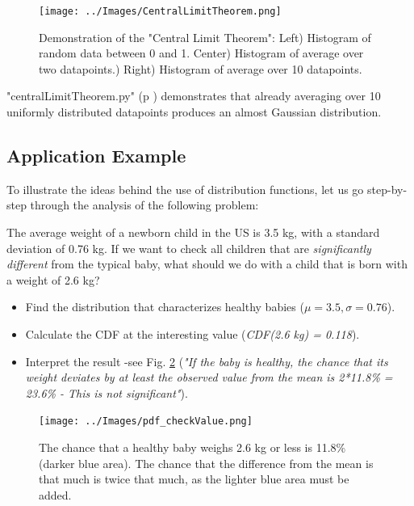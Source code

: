 \begin{figure}
  \centering
  \texttt{[image: ../Images/CentralLimitTheorem.png]}\\
  \caption{Demonstration of the "Central Limit Theorem": Left) Histogram of random data between 0 and 1. Center) Histogram of average over two datapoints.) Right) Histogram of average over 10 datapoints.}\label{fig:CentralLimitTheorem}
\end{figure}

\PyImg "centralLimitTheorem.py" (p \pageref{py:centralLimitTheorem}) demonstrates that already averaging over 10 uniformly distributed datapoints produces an almost Gaussian distribution.

\subsection{Application Example}

To illustrate the ideas behind the use of distribution functions, let us go step-by-step through the analysis of the following problem:

The average weight of a newborn child in the US is 3.5 kg, with a standard deviation of 0.76 kg. If we want to check all children that are \emph{significantly different} from the typical baby, what should we do with a child that is born with a weight of 2.6 kg?

\begin{itemize}
  \item Find the distribution that characterizes healthy babies ($\mu=3.5, \sigma=0.76$).
  \item Calculate the CDF at the interesting value (\emph{CDF(2.6 kg) = 0.118}).
  \item Interpret the result -see Fig. \ref{fig:pdf_checkValue} (\emph{"If the baby is healthy, the chance that its weight deviates by at least the observed value from the mean is 2*11.8\% = 23.6\% - This is not significant"}).
\end{itemize}

\begin{figure}
  \centering
  \texttt{[image: ../Images/pdf\_checkValue.png]}\\
  \caption{The chance that a healthy baby weighs 2.6 kg or less is 11.8\% (darker blue area). The chance that the difference from the mean is that much is twice that much, as the lighter blue area must be added.}\label{fig:pdf_checkValue}
\end{figure}

